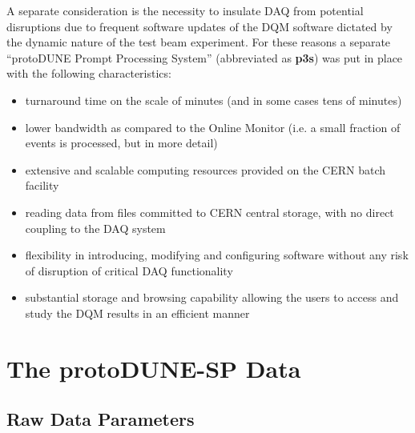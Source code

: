 \documentclass{webofc}
\newcommand{\pd}{protoDUNE\xspace}
\begin{document}
A separate consideration is the necessity to insulate DAQ from
potential disruptions due to frequent software updates of the DQM software dictated by
the dynamic nature of the test beam experiment. 
For these reasons a separate ``\pd Prompt Processing System'' (abbreviated as \textbf{p3s}) was put
in place \cite{eps} with the following characteristics:
\begin{itemize} 

\item turnaround time on the scale of minutes (and in some cases tens of minutes)

\item lower bandwidth as compared to the Online Monitor (i.e. a small fraction of events is processed,
but in more detail)

\item extensive and scalable computing resources provided on the CERN batch facility

\item reading data from files committed to CERN central storage, with no direct coupling to the DAQ system

\item flexibility in introducing, modifying and configuring software without any risk of disruption of
critical DAQ functionality

\item substantial storage and browsing capability allowing the users to access and study
the DQM results in an efficient manner

\end{itemize}


\section{The protoDUNE-SP Data}
\subsection{Raw Data Parameters}
\label{sec:np04_data_rate}
\end{document}
